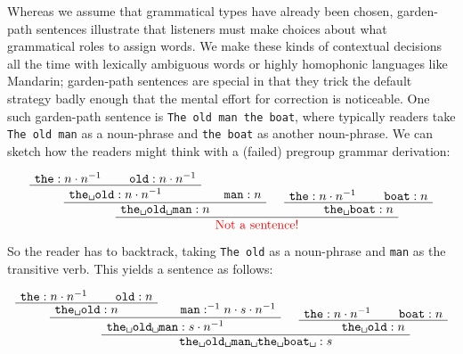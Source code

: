 \begin{example}
Whereas we assume that grammatical types have already been chosen, garden-path sentences illustrate that listeners must make choices about what grammatical roles to assign words. We make these kinds of contextual decisions all the time with lexically ambiguous words or highly homophonic languages like Mandarin; garden-path sentences are special in that they trick the default strategy badly enough that the mental effort for correction is noticeable. One such garden-path sentence is \texttt{The old man the boat}, where typically readers take \texttt{The old man} as a noun-phrase and \texttt{the boat} as another noun-phrase. We can sketch how the readers might think with a (failed) pregroup grammar derivation:

\newpage

\[
\AxiomC{$\texttt{the} : n \cdot n^{-1}$}
\AxiomC{$\texttt{old} : n \cdot n^{-1}$}
\BinaryInfC{$\texttt{the\textvisiblespace old}: n \cdot n^{-1}$}
\AxiomC{$\texttt{man} : n$}
\BinaryInfC{$\texttt{the\textvisiblespace old\textvisiblespace man}: n$}
\AxiomC{$\texttt{the} : n \cdot n^{-1}$}
\AxiomC{$\texttt{boat} : n$}
\BinaryInfC{$\texttt{the\textvisiblespace boat}: n$}
\BinaryInfC{\textcolor{red}{Not a sentence!}}
\DisplayProof
\]

So the reader has to backtrack, taking \texttt{The old} as a noun-phrase and \texttt{man} as the transitive verb. This yields a sentence as follows:

\[
\AxiomC{$\texttt{the} : n \cdot n^{-1}$}
\AxiomC{$\texttt{old} : n$}
\BinaryInfC{$\texttt{the\textvisiblespace old}: n$}
\AxiomC{$\texttt{man} : ^{-1}n \cdot s \cdot n^{-1}$}
\BinaryInfC{$\texttt{the\textvisiblespace old\textvisiblespace man}: s \cdot n^{-1}$}
\AxiomC{$\texttt{the} : n \cdot n^{-1}$}
\AxiomC{$\texttt{boat} : n$}
\BinaryInfC{$\texttt{the\textvisiblespace old}: n$}
\BinaryInfC{$\texttt{the\textvisiblespace old\textvisiblespace man\textvisiblespace the\textvisiblespace boat\textvisiblespace}: s$}
\DisplayProof
\]
\end{example}

